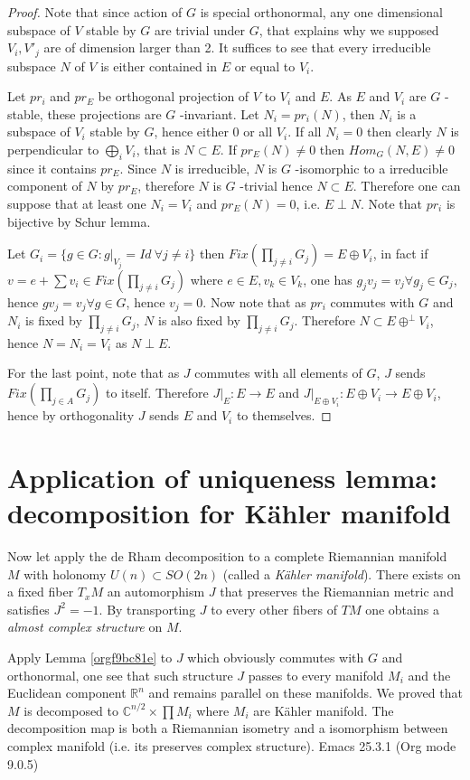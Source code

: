 \documentclass[11pt]{article}
\begin{document}
\begin{proof}
Note that since action of \(G\) is special orthonormal, any one dimensional subspace of \(V\) stable by
\(G\) are trivial under \(G\), that explains why we supposed \(V_i, V'_j\) are of dimension larger
than 2. It suffices to see that every irreducible subspace \(N\) of \(V\) is either contained in \(E\) or equal to
\(V_i\).

Let \(pr_i\) and \(pr_E\) be orthogonal projection of \(V\) to \(V_i\) and \(E\). As \(E\) and \(V_i\) are \(G\) -stable, these
projections are \(G\) -invariant. Let \(N_i = pr_i(N)\), then \(N_i\) is a subspace of \(V_i\) stable
by \(G\), hence either \(0\) or all \(V_i\). If all \(N_i=0\) then clearly \(N\) is perpendicular to \(\bigoplus_i
V_i\), that is \(N\subset E\). If \(pr_E(N)\ne 0\) then \(Hom_G(N, E) \ne 0\) since it contains \(pr_E\). Since
\(N\) is irreducible, \(N\) is \(G\) -isomorphic to a irreducible component of \(N\) by \(pr_E\), therefore
\(N\) is \(G\) -trivial hence \(N\subset E\). Therefore one can suppose that at least one \(N_i = V_i\) and
\(pr_E(N) = 0\), i.e. \(E\perp N\). Note that \(pr_i\) is bijective by Schur lemma.

Let \(G_i = \{g\in G: g|_{V_j} = Id\ \forall j\ne i \}\) then \(Fix(\prod_{j\ne i} G_j)= E\oplus V_i\), in fact if \(v = e +\sum v_i\in Fix(\prod_{j\ne i}
G_j)\) where \(e\in E, v_k\in V_k\), one has \(g_j v_j = v_j \forall g_j \in G_j\), hence \(g v_j = v_j
\forall g\in G\), hence \(v_j = 0\). Now note that as \(pr_i\) commutes with \(G\) and \(N_i\) is fixed by
\(\prod_{j\ne i}G_j\), \(N\) is also fixed by \(\prod_{j\ne i}G_j\). Therefore \(N\subset E \oplus^\perp
V_i\), hence \(N = N_i=V_i\) as \(N\perp E\).

For the last point, note that as \(J\) commutes with all elements of \(G\), \(J\) sends \(Fix(\prod_{j\in
A} G_j)\) to itself. Therefore \(J|_E: E\longrightarrow E\) and \(J|_{E\oplus V_i}: E\oplus
V_i\longrightarrow E\oplus V_i\), hence by orthogonality \(J\) sends \(E\) and \(V_i\) to themselves.
\end{proof}


\section{Application of uniqueness lemma: decomposition for Kähler manifold}
\label{sec:org83afeb1}
Now let apply the de Rham decomposition to a complete Riemannian manifold \(M\) with holonomy \(U(n)
\subset SO(2n)\) (called a \emph{Kähler manifold}). There exists on a fixed fiber \(T_xM\) an automorphism
\(J\) that preserves the Riemannian metric and satisfies \(J^2 = -1\). By transporting \(J\) to every other
fibers of \(TM\) one obtains a \emph{almost complex structure} on \(M\).

Apply Lemma \ref{orgf9bc81e} to \(J\) which obviously commutes with \(G\) and orthonormal, one
see that such structure \(J\) passes to every manifold \(M_i\) and the Euclidean component \(\mathbb{R}^n\) and
remains parallel on these manifolds. We proved that \(M\) is decomposed to \(\mathbb{C}^{n/2}\times
\prod M_i\) where \(M_i\) are Kähler manifold. The decomposition map is both a Riemannian isometry and
a isomorphism between complex manifold (i.e. its preserves complex structure). 
Emacs 25.3.1 (Org mode 9.0.5)
\end{document}
